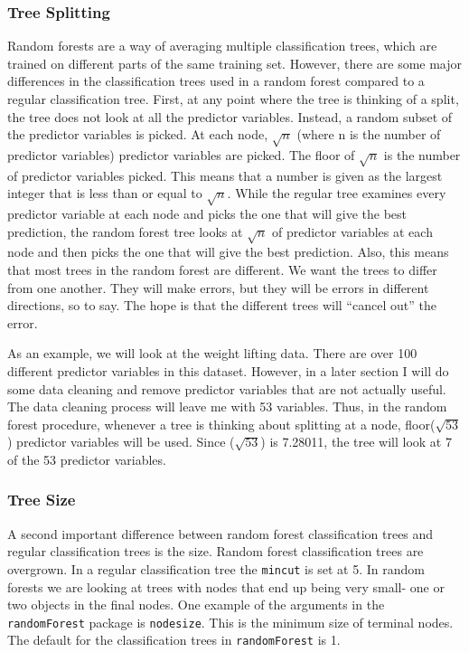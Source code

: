 \documentclass[12pt,twoside]{reedthesis}
\begin{document}
  \subsubsection{Tree Splitting}\label{tree-splitting}
  
  Random forests are a way of averaging multiple classification trees,
  which are trained on different parts of the same training set. However,
  there are some major differences in the classification trees used in a
  random forest compared to a regular classification tree. First, at any
  point where the tree is thinking of a split, the tree does not look at
  all the predictor variables. Instead, a random subset of the predictor
  variables is picked. At each node, \(\sqrt{n}\) (where n is the number
  of predictor variables) predictor variables are picked. The floor of
  \(\sqrt{n}\) is the number of predictor variables picked. This means
  that a number is given as the largest integer that is less than or equal
  to \(\sqrt{n}\). While the regular tree examines every predictor
  variable at each node and picks the one that will give the best
  prediction, the random forest tree looks at \(\sqrt{n}\) of predictor
  variables at each node and then picks the one that will give the best
  prediction. Also, this means that most trees in the random forest are
  different. We want the trees to differ from one another. They will make
  errors, but they will be errors in different directions, so to say. The
  hope is that the different trees will ``cancel out'' the error.
  
  As an example, we will look at the weight lifting data. There are over
  100 different predictor variables in this dataset. However, in a later
  section I will do some data cleaning and remove predictor variables that
  are not actually useful. The data cleaning process will leave me with 53
  variables. Thus, in the random forest procedure, whenever a tree is
  thinking about splitting at a node, floor(\(\sqrt{53}\)) predictor
  variables will be used. Since (\(\sqrt{53}\)) is 7.28011, the tree will
  look at 7 of the 53 predictor variables.
  
  \subsubsection{Tree Size}\label{tree-size}
  
  A second important difference between random forest classification trees
  and regular classification trees is the size. Random forest
  classification trees are overgrown. In a regular classification tree the
  \texttt{mincut} is set at 5. In random forests we are looking at trees
  with nodes that end up being very small- one or two objects in the final
  nodes. One example of the arguments in the \texttt{randomForest} package
  is \texttt{nodesize}. This is the minimum size of terminal nodes. The
  default for the classification trees in \texttt{randomForest} is 1.
  
\end{document}
